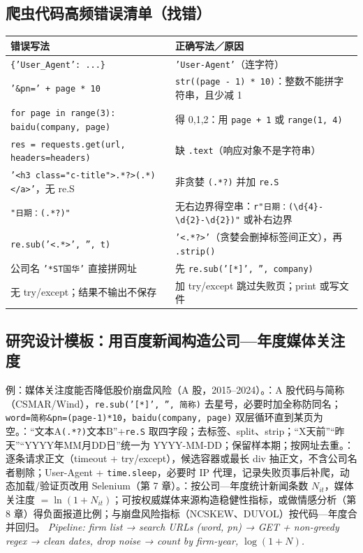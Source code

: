 \subsection{爬虫代码高频错误清单（找错）}\label{sec:D06-bugs}
\begin{center}\footnotesize\renewcommand{\arraystretch}{1.0}
\begin{tabularx}{\linewidth}{@{}p{7.6cm}L@{}}
\toprule
错误写法 & 正确写法／原因 \\
\midrule
\texttt{\{'User\_Agent': ...\}} & \texttt{'User-Agent'}（连字符）\\
\texttt{'\&pn=' + page * 10} & \texttt{str((page - 1) * 10)}：整数不能拼字符串，且少减 1 \\
\texttt{for page in range(3): baidu(company, page)} & 得 0,1,2：用 \texttt{page + 1} 或 \texttt{range(1, 4)} \\
\texttt{res = requests.get(url, headers=headers)} & 缺 \texttt{.text}（响应对象不是字符串）\\
\texttt{'<h3 class="c-title">.*?>(.*)</a>'}，无 re.S & 非贪婪 \texttt{(.*?)} 并加 \texttt{re.S} \\
\texttt{"日期：(.*?)"} & 无右边界得空串：\texttt{r"日期：(\textbackslash d\{4\}-\textbackslash d\{2\}-\textbackslash d\{2\})"} 或补右边界 \\
\texttt{re.sub('<.*>', '', t)} & \texttt{'<.*?>'}（贪婪会删掉标签间正文），再 \texttt{.strip()} \\
公司名 \texttt{'*ST国华'} 直接拼网址 & 先 \texttt{re.sub('[*]', '', company)} \\
无 try/except；结果不输出不保存 & 加 try/except 跳过失败页；print 或写文件 \\
\bottomrule
\end{tabularx}
\end{center}

\subsection{研究设计模板：用百度新闻构造公司—年度媒体关注度}\label{sec:D06-design}
例：媒体关注度能否降低股价崩盘风险（A 股，2015–2024）。：A 股代码与简称（CSMAR/Wind），\texttt{re.sub('[*]', '', 简称)} 去星号，必要时加全称防同名；\texttt{word=简称\&pn=(page-1)*10}，\texttt{baidu(company, page)} 双层循环直到某页为空。：“文本A\texttt{(.*?)}文本B”+\texttt{re.S} 取四字段；去标签、split、strip；“X天前”“昨天”“YYYY年MM月DD日”统一为 YYYY-MM-DD；保留样本期；按网址去重。：逐条请求正文（timeout + try/except），候选容器或最长 div 抽正文，不含公司名者剔除；User-Agent + \texttt{time.sleep}，必要时 IP 代理，记录失败页事后补爬，动态加载/验证页改用 Selenium（第 7 章）。：按公司—年度统计新闻条数 $N_{it}$，媒体关注度 $=\ln(1+N_{it})$；可按权威媒体来源构造稳健性指标，或做情感分析（第 8 章）得负面报道比例；与崩盘风险指标（NCSKEW、DUVOL）按代码—年度合并回归。
\textit{Pipeline: firm list → search URLs (word, pn) → GET + non-greedy regex → clean dates, drop noise → count by firm-year, $\log(1+N)$.}
